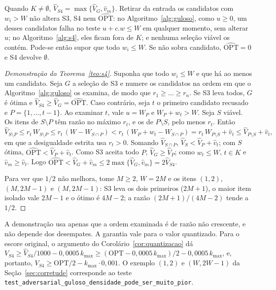 \documentclass[11pt,a4paper]{article}
\theoremstyle{plain}
\theoremstyle{definition}
\theoremstyle{plain}
\begin{document}
Quando $K\ne\emptyset$, $\hat{V}_{S4}=\max\{\hat{V}_G,\hat{v}_m\}$. Retirar da entrada os
candidatos com $w_i>W$ não altera S3, S4 nem $\widehat{\mathrm{OPT}}$: no
Algoritmo~\ref{alg:guloso}, como $u\ge 0$, um desses candidatos falha no teste
$u+c.w\le W$ em qualquer momento, sem alterar $u$; no Algoritmo~\ref{alg:s4}, eles ficam
fora de $K$; e nenhuma seleção viável os contém. Pode-se então supor que todo
$w_i\le W$. Se não sobra candidato, $\widehat{\mathrm{OPT}}=0$ e S4 devolve $\emptyset$.

\begin{proof}[Demonstração do Teorema~\ref{teo:s4}]
Suponha que todo $w_i\le W$ e que há ao menos um candidato. Seja $G$ a seleção de S3 e
numere os candidatos na ordem em que o Algoritmo~\ref{alg:guloso} os examina, de modo que
$r_1\ge\dots\ge r_n$. Se S3 leva todos, $G$ é ótima e
$\hat{V}_{S4}\ge\hat{V}_G=\widehat{\mathrm{OPT}}$.
Caso contrário, seja $t$ o primeiro candidato recusado e $P=\{1,\dots,t-1\}$. Ao examinar
$t$, vale $u=W_P$ e $W_P+w_t>W$. Seja $S$ viável. Os itens de $S\setminus P$ têm razão no
máximo $r_t$, e os de $P\setminus S$, pelo menos $r_t$. Então
\[
\hat{V}_{S\setminus P}\le r_t\,W_{S\setminus P}\le r_t\,(W-W_{S\cap P})
< r_t\,(W_P+w_t-W_{S\cap P}) = r_t\,W_{P\setminus S}+\hat{v}_t
\le \hat{V}_{P\setminus S}+\hat{v}_t ,
\]
em que a desigualdade estrita usa $r_t>0$. Somando $\hat{V}_{S\cap P}$,
$\hat{V}_S<\hat{V}_P+\hat{v}_t$; com $S$ ótima, $\widehat{\mathrm{OPT}}<\hat{V}_P+\hat{v}_t$.
Como S3 aceita todo $P$, $\hat{V}_G\ge\hat{V}_P$; como $w_t\le W$, $t\in K$ e
$\hat{v}_m\ge\hat{v}_t$. Logo
$\widehat{\mathrm{OPT}}<\hat{V}_G+\hat{v}_m\le 2\max\{\hat{V}_G,\hat{v}_m\}=2\hat{V}_{S4}$.

Para ver que $1/2$ não melhora, tome $M\ge 2$, $W=2M$ e os itens $(1,2)$, $(M,2M-1)$ e $(M,2M-1)$:
S3 leva os dois primeiros ($2M+1$), o maior item isolado vale $2M-1$ e o ótimo é $4M-2$;
a razão $(2M+1)/(4M-2)$ tende a $1/2$.
\end{proof}

A demonstração usa apenas que a ordem examinada é de razão não crescente, e não depende
dos desempates. A garantia vale para o valor quantizado. Para o escore original, o
argumento do Corolário~\ref{cor:quantizacao} dá
$V_{S4}\ge \hat{V}_{S4}/1000-0{,}0005\,k_{\max}\ge(\mathrm{OPT}-0{,}0005\,k_{\max})/2-0{,}0005\,k_{\max}$,
e, portanto, $V_{S4}\ge\mathrm{OPT}/2-k_{\max}\cdot 0{,}001$.
O exemplo $(1,2)$ e $(W,2W-1)$ da Seção~\ref{sec:corretude} corresponde ao teste
\texttt{test\_adversarial\_guloso\_densidade\_}\allowbreak\texttt{pode\_ser\_muito\_pior}.
\end{document}
